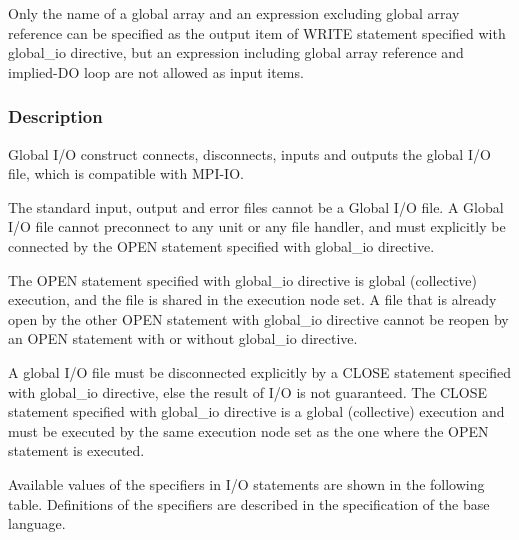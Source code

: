    Only the name of a global array and an
   expression excluding global array reference can be specified as the output item
   of WRITE statement specified with global\_io directive, 
   but an expression including global array
   reference and implied-DO loop are not allowed as input items.


   \subsubsection*{Description}

   Global I/O construct connects, disconnects, inputs and outputs the global I/O file,
   which is compatible with MPI-IO.

   The standard input, output and error files cannot be a Global I/O file.
   A Global I/O file cannot preconnect to any unit or any file handler,
   and must explicitly be connected by the OPEN statement specified with
   global\_io directive.

   The OPEN statement specified with global\_io directive is global
   (collective) execution, and the file is shared in the execution node
   set.
   A file that is already open by the other OPEN statement with
   global\_io directive cannot be reopen by an OPEN statement with or
   without global\_io directive.

   A global I/O file must be disconnected explicitly by a CLOSE
   statement specified with global\_io directive, else the result of I/O
   is not guaranteed.
   The CLOSE statement specified with global\_io directive is a global
   (collective) execution and must be executed by the same execution
   node set as the one where the OPEN statement is executed.

   Available values of the specifiers in I/O statements are shown in the
   following table.
   Definitions of the specifiers are described in the specification of
   the base language.


